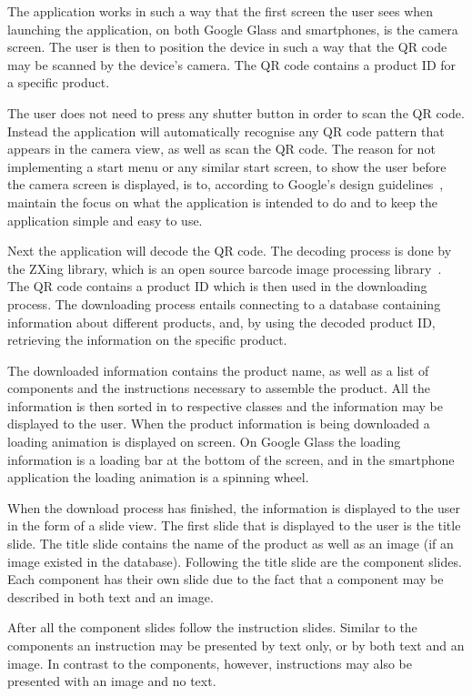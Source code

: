 The application works in such a way that the first screen the user sees when launching the application, on both Google Glass and smartphones, is the camera screen. The user is then to position the device in such a way that the QR code may be scanned by the device's camera. The QR code contains a product ID for a specific product.

The user does not need to press any shutter button in order to scan the QR code. Instead the application will automatically recognise any QR code pattern that appears in the camera view, as well as scan the QR code. The reason for not implementing a start menu or any similar start screen, to show the user before the camera screen is displayed, is to, according to Google's design guidelines~\cite{androidDesignPrinciples, glassDesignPrinciples}, maintain the focus on what the application is intended to do and to keep the application simple and easy to use.

Next the application will decode the QR code. The decoding process is done by the ZXing library, which is an open source  barcode image processing library~\cite{zxing}. The QR code contains a product ID which is then used in the downloading process. The downloading process entails connecting to a database containing information about different products, and, by using the decoded product ID, retrieving the information on the specific product. 

The downloaded information contains the product name, as well as a list of components and the instructions necessary to assemble the product. All the information is then sorted in to respective classes and the information may be displayed to the user. When the product information is being downloaded a loading animation is displayed on screen. On Google Glass the loading information is a loading bar at the bottom of the screen, and in the smartphone application the loading animation is a spinning wheel.

When the download process has finished, the information is displayed to the user in the form of a slide view. The first slide that is displayed to the user is the title slide. The title slide contains the name of the product as well as an image  (if an image existed in the database). Following the title slide are the component slides. Each component has their own slide due to the fact that a component may be described in both text and an image. 

After all the component slides follow the instruction slides. Similar to the components an instruction may be presented by text only, or by both text and an image. In contrast to the components, however, instructions may also be presented with an image and no text. 

